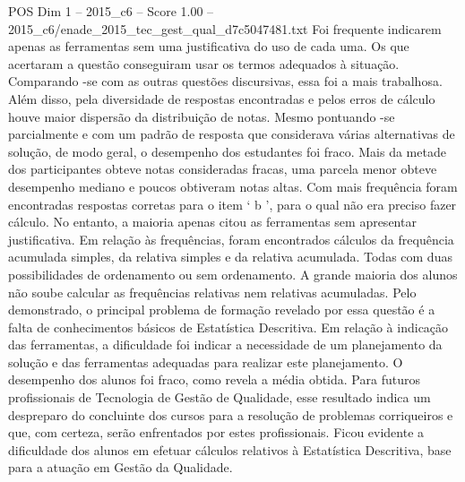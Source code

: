 \begin{textsample}{POS Dim 1 – 2015\_c6 – Score 1.00 – 2015\_c6/enade\_2015\_tec\_gest\_qual\_d7c5047481.txt}
Foi frequente indicarem apenas as ferramentas sem uma justificativa do uso de cada uma.
Os que acertaram a questão conseguiram usar os termos adequados à situação.
Comparando -se com as outras questões discursivas, essa foi a mais trabalhosa.
Além disso, pela diversidade de respostas encontradas e pelos erros de cálculo houve maior dispersão da distribuição de notas.
Mesmo pontuando -se parcialmente e com um padrão de resposta que considerava várias alternativas de solução, de modo geral, o desempenho dos estudantes foi fraco.
Mais da metade dos participantes obteve notas consideradas fracas, uma parcela menor obteve desempenho mediano e poucos obtiveram notas altas.
Com mais frequência foram encontradas respostas corretas para o item ‘ b ’, para o qual não era preciso fazer cálculo.
No entanto, a maioria apenas citou as ferramentas sem apresentar justificativa.
Em relação às frequências, foram encontrados cálculos da frequência acumulada simples, da relativa simples e da relativa acumulada.
Todas com duas possibilidades de ordenamento ou sem ordenamento.
A grande maioria dos alunos não soube calcular as frequências relativas nem relativas acumuladas.
Pelo demonstrado, o principal problema de formação revelado por essa questão é a falta de conhecimentos básicos de Estatística Descritiva.
Em relação à indicação das ferramentas, a dificuldade foi indicar a necessidade de um planejamento da solução e das ferramentas adequadas para realizar este planejamento.
O desempenho dos alunos foi fraco, como revela a média obtida.
Para futuros profissionais de Tecnologia de Gestão de Qualidade, esse resultado indica um despreparo do concluinte dos cursos para a resolução de problemas corriqueiros e que, com certeza, serão enfrentados por estes profissionais.
Ficou evidente a dificuldade dos alunos em efetuar cálculos relativos à Estatística Descritiva, base para a atuação em Gestão da Qualidade.

\end{textsample}
